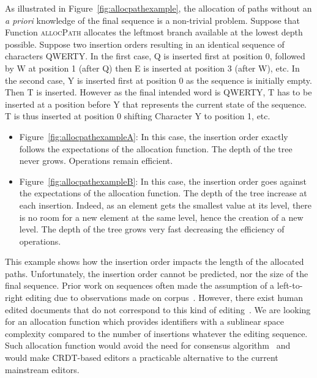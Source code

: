 As illustrated in Figure~\ref{fig:allocpathexample}, the allocation of paths
without an \emph{a priori} knowledge of the final sequence is a non-trivial
problem.  Suppose that Function \textsc{allocPath} allocates the leftmost branch
available at the lowest depth possible. Suppose two insertion orders resulting
in an identical sequence of characters QWERTY.  In the first case, Q is inserted
first at position 0, followed by W at position 1 (after Q) then E is inserted at
position 3 (after W), etc.  In the second case, Y is inserted first at position
0 as the sequence is initially empty. Then T is inserted. However as the final
intended word is QWERTY, T has to be inserted at a position before Y that
represents the current state of the sequence. T is thus inserted at position 0
shifting Character Y to position 1, etc.


\begin{itemize}[noitemsep, leftmargin=*]
\item Figure~\ref{fig:allocpathexampleA}: In this case, the insertion order
  exactly follows the expectations of the allocation function. The depth of the
  tree never grows. Operations remain efficient.

\item Figure~\ref{fig:allocpathexampleB}: In this case, the insertion order goes
  against the expectations of the allocation function. The depth of the tree
  increase at each insertion. Indeed, as an element gets the smallest value at
  its level, there is no room for a new element at the same level, hence the
  creation of a new level. The depth of the tree grows very fast decreasing the
  efficiency of operations.
\end{itemize}

This example shows how the insertion order impacts the length of the allocated
paths. Unfortunately, the insertion order cannot be predicted, nor the size of
the final sequence. Prior work on sequences often made the assumption of a
left-to-right editing due to observations made on
corpus~\cite{preguica2009commutative, weiss2009logoot}. However, there exist
human edited documents that do not correspond to this kind of
editing~\cite{nedelec2013lseq}.
We are looking for an allocation function which provides identifiers with a
sublinear space complexity compared to the number of insertions whatever the
editing sequence. Such allocation function would avoid the need for consensus
algorithm~\cite{mostefaoui2015signature} and would make CRDT-based editors a
practicable alternative to the current mainstream editors.
 
